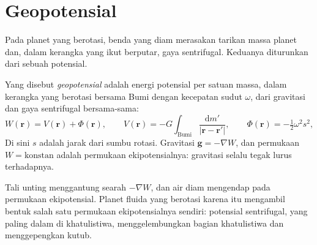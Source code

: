 \section{Geopotensial}

Pada planet yang berotasi, benda yang diam merasakan tarikan massa planet
dan, dalam kerangka yang ikut berputar, gaya sentrifugal. Keduanya diturunkan dari
sebuah potensial.

\begin{definition}[Geopotensial]\label{def:b3:gravity-geodesy:geopotential}
Yang disebut \emph{geopotensial} adalah energi potensial per satuan
massa, dalam kerangka yang berotasi bersama Bumi dengan kecepatan sudut $\omega$, dari
gravitasi dan gaya sentrifugal bersama-sama:
\[
  W(\mathbf r) = V(\mathbf r) + \Phi(\mathbf r),\qquad
  V(\mathbf r) = -G\int_{\text{Bumi}}\frac{\mathrm dm'}{|\mathbf r - \mathbf r'|},\qquad
  \Phi(\mathbf r) = -\tfrac12\omega^2 s^2,
\]
Di sini $s$ adalah jarak dari sumbu rotasi. Gravitasi
$\mathbf g = -\nabla W$, dan permukaan $W = \text{konstan}$ adalah
permukaan ekipotensialnya: gravitasi selalu tegak lurus terhadapnya.
\end{definition}

Tali unting menggantung searah $-\nabla W$, dan air diam mengendap pada
permukaan ekipotensial. Planet fluida yang berotasi karena itu mengambil bentuk salah satu
permukaan ekipotensialnya sendiri: potensial sentrifugal, yang paling dalam di khatulistiwa, menggelembungkan
bagian khatulistiwa dan menggepengkan kutub.

